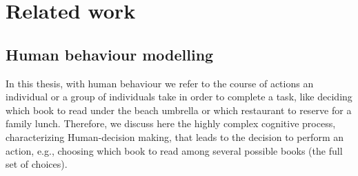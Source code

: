 
\chapter{Related work}
\label{cha:related work}
\ifpdf
\graphicspath{{Chapter2/Figs/Raster/}{Chapter2/Figs/PDF/}{Chapter2/Figs/}}
\else
\graphicspath{{Chapter2/Figs/Vector/}{Chapter2/Figs/}}
\fi

\section{Human behaviour modelling}


\label{sec:human_behaviour_modelling}
In this thesis, with human behaviour we refer to the course of actions an individual or a group of individuals take in order to complete a task, like deciding which book to read under the beach umbrella or which restaurant to reserve for a family lunch. Therefore, we discuss here the highly complex cognitive process, characterizing Human-decision making, that leads to the decision to perform an action, e.g., choosing which book to read among several possible books (the full set of choices).

